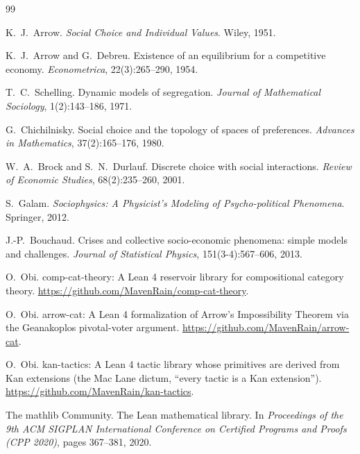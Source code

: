 \documentclass[11pt,a4paper]{article}
\theoremstyle{plain}
\theoremstyle{definition}
\theoremstyle{remark}
\begin{document}
\begin{thebibliography}{99}

K.\ J.\ Arrow.
\textit{Social Choice and Individual Values}.
Wiley, 1951.

K.\ J.\ Arrow and G.\ Debreu.
Existence of an equilibrium for a competitive economy.
\textit{Econometrica}, 22(3):265--290, 1954.

T.\ C.\ Schelling.
Dynamic models of segregation.
\textit{Journal of Mathematical Sociology}, 1(2):143--186, 1971.

G.\ Chichilnisky.
Social choice and the topology of spaces of preferences.
\textit{Advances in Mathematics}, 37(2):165--176, 1980.

W.\ A.\ Brock and S.\ N.\ Durlauf.
Discrete choice with social interactions.
\textit{Review of Economic Studies}, 68(2):235--260, 2001.

S.\ Galam.
\textit{Sociophysics: A Physicist's Modeling of Psycho-political
Phenomena}.
Springer, 2012.

J.-P.\ Bouchaud.
Crises and collective socio-economic phenomena: simple models and
challenges.
\textit{Journal of Statistical Physics}, 151(3-4):567--606, 2013.

O.\ Obi.
comp-cat-theory: A Lean 4 reservoir library for compositional category
theory.
\url{https://github.com/MavenRain/comp-cat-theory}.

O.\ Obi.
arrow-cat: A Lean 4 formalization of Arrow's Impossibility Theorem via
the Geanakoplos pivotal-voter argument.
\url{https://github.com/MavenRain/arrow-cat}.

O.\ Obi.
kan-tactics: A Lean 4 tactic library whose primitives are derived
from Kan extensions (the Mac Lane dictum, ``every tactic is a Kan
extension'').
\url{https://github.com/MavenRain/kan-tactics}.

The mathlib Community.
The Lean mathematical library.
In \textit{Proceedings of the 9th ACM SIGPLAN International
Conference on Certified Programs and Proofs (CPP 2020)},
pages 367--381, 2020.

\end{thebibliography}
\end{document}
